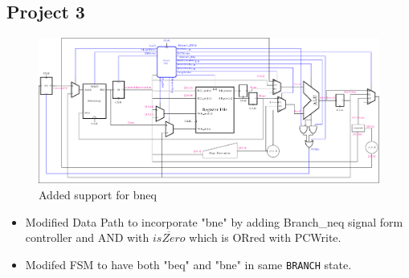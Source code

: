 \documentclass{article}
\begin{document}
\subsection*{Project 3}
\begin{figure}[H]
    \begin{center}
        \includegraphics[scale=0.7]{MultiCycleImplementation_NewOnes/TexFiles/MultiCycle_NewOnes3.pdf}
        \caption*{Added support for bneq}
    \end{center}
\end{figure}
\begin{itemize}
    \item Modified Data Path to incorporate "bne" by adding Branch\_neq signal form controller and AND with $\overline{isZero}$ which is ORred with PCWrite.
    \item Modifed FSM to have both "beq" and "bne" in same \verb|BRANCH| state.
\end{itemize}
\end{document}
